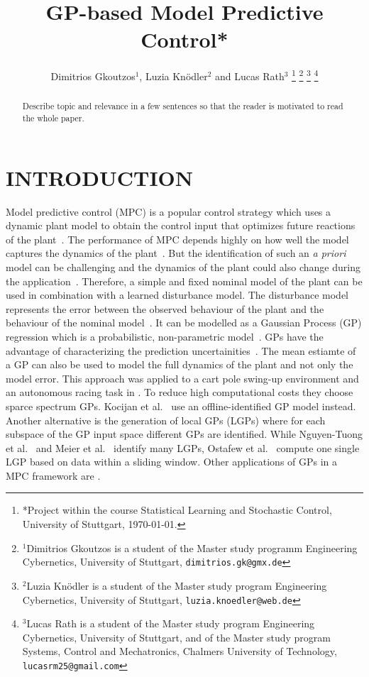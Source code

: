 \documentclass[letterpaper, 10 pt, conference]{ieeeconf}  %
\title{\LARGE \bf
GP-based Model Predictive Control*
}
\author{Dimitrios Gkoutzos$^{1}$, Luzia Knödler$^{2}$ and Lucas Rath$^{3}$%
\thanks{*Project within the course Statistical Learning and Stochastic Control, University of Stuttgart, \today.}%
\thanks{$^{1}$Dimitrios Gkoutzos is a student of the Master study programm Engineering Cybernetics, University of Stuttgart,
        {\tt\small dimitrios.gk@gmx.de}}%
\thanks{$^{2}$Luzia Knödler is a student of the Master study program Engineering Cybernetics, University of Stuttgart,
        {\tt\small luzia.knoedler@web.de}}%
\thanks{$^{3}$Lucas Rath is a student of the Master study program Engineering Cybernetics, University of Stuttgart, and of the Master study program Systems, Control and Mechatronics, Chalmers University of Technology,
        {\tt\small lucasrm25@gmail.com}}%
}
\begin{document}
\maketitle
\thispagestyle{empty}
\pagestyle{empty}


\begin{abstract}

Describe topic and relevance in a few sentences so that the reader is motivated to
read the whole paper.

\end{abstract}


\section{INTRODUCTION}
Model predictive control (MPC) is a popular control strategy which uses a dynamic plant model to obtain the control input that optimizes future reactions of the plant~\cite{kocijan2004gaussian}. The performance of MPC depends highly on how well the model captures the dynamics of the plant~\cite{kabzan2019learning}. But the identification of such an \textit{a priori} model can be challenging and the dynamics of the plant could also change during the application~\cite{kabzan2019learning,ostafew2014learning}. Therefore, a simple and fixed nominal model of the plant can be used in combination with a learned disturbance model. The disturbance model represents the error between the observed behaviour of the plant and the behaviour of the nominal model~\cite{ostafew2014learning}. It can be modelled as a Gaussian Process (GP) regression which is a probabilistic, non-parametric model~\cite{kocijan2004gaussian}. GPs have the advantage of characterizing the prediction uncertainities~\cite{kocijan2004gaussian}. The mean estiamte of a GP can also be used to model the full dynamics of the plant and not only the model error. This approach was applied to a cart pole swing-up environment and an autonomous racing task in \cite{van2017online}. To reduce high computational costs they choose sparce spectrum GPs. Kocijan et al.~\cite{kocijan2004gaussian} use an offline-identified GP model instead. Another alternative is the generation of local GPs (LGPs) where for each subspace of the GP input space different GPs are identified. While Nguyen-Tuong et al.~\cite{nguyen2009local} and Meier et al.~\cite{meier2014efficient} identify many LGPs, Ostafew et al.~\cite{ostafew2014learning} compute one single LGP based on data within a sliding window. Other applications of GPs in a MPC framework are .
\end{document}
